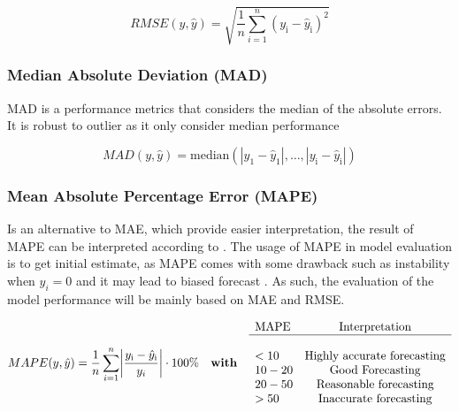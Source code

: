 \begin{equation}\label{eqn:RMSE}
    RMSE(y,\hat{y}) = \sqrt{\frac{1}{n}\sum_{i=1}^{n} (y_{\text{i}} - \hat{y}_{\text{i}})^2} 
\end{equation}

\subsubsection*{Median Absolute Deviation (MAD)}\label{sec:MAD} 

MAD is a performance metrics that considers the median of the absolute errors. It is robust to outlier as it only consider median performance

\begin{equation}\label{eqn:MAD}
    MAD(y,\hat{y}) =  \text{median} (|y_{\text{1}} - \hat{y}_{\text{1}}|,\dots,|y_{\text{i}} - \hat{y}_{\text{i}}|)
\end{equation}

\subsubsection*{Mean Absolute Percentage Error (MAPE)}

Is an alternative to MAE, which provide easier interpretation, the result of MAPE can be interpreted according to  . The usage of MAPE in model evaluation is to get initial estimate, as MAPE comes with some drawback such as instability when $y_i = 0$ and it may lead to biased forecast . As such, the evaluation of the model performance will be mainly based on MAE and RMSE.    

\begin{equation}\label{eqn:MAPE}
    MAPE(y,\hat{y}) = \frac{1}{n}\sum_{i=1}^{n} \biggl|\frac{y_{\text{i}} - \hat{y}_{\text{i}}}{y_i}\biggr| \cdot 100\%  \quad \textbf{with} \quad \begin{array}{l c}
        \text{MAPE} & \text{Interpretation}\\
        \hline\\
        < 10 & \text{Highly accurate forecasting} \\
        10-20 & \text{Good Forecasting} \\
        20-50 & \text{Reasonable forecasting}\\
        > 50 & \text{Inaccurate forecasting} \\
    \end{array}
\end{equation}

